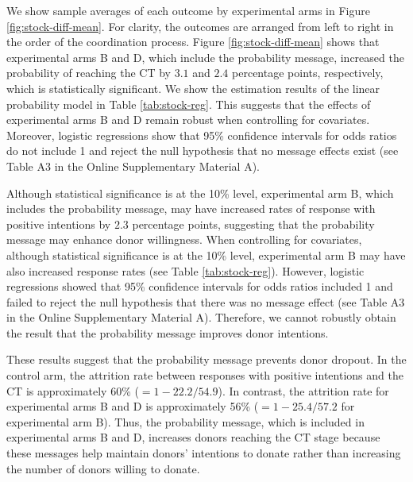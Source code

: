 \documentclass[12pt, a4paper]{article}
\begin{document}
We show sample averages of each outcome by experimental arms in Figure \ref{fig:stock-diff-mean}. For clarity, the outcomes are arranged from left to right in the order of the coordination process. Figure \ref{fig:stock-diff-mean} shows that experimental arms B and D, which include the probability message, increased the probability of reaching the CT by \(3.1\) and \(2.4\) percentage points, respectively, which is statistically significant. We show the estimation results of the linear probability model in Table \ref{tab:stock-reg}. This suggests that the effects of experimental arms B and D remain robust when controlling for covariates. Moreover, logistic regressions show that 95\% confidence intervals for odds ratios do not include 1 and reject the null hypothesis that no message effects exist (see Table A3 in the Online Supplementary Material A).

Although statistical significance is at the 10\% level, experimental arm B, which includes the probability message, may have increased rates of response with positive intentions by \(2.3\) percentage points, suggesting that the probability message may enhance donor willingness. When controlling for covariates, although statistical significance is at the 10\% level, experimental arm B may have also increased response rates (see Table \ref{tab:stock-reg}). However, logistic regressions showed that 95\% confidence intervals for odds ratios included 1 and failed to reject the null hypothesis that there was no message effect (see Table A3 in the Online Supplementary Material A). Therefore, we cannot robustly obtain the result that the probability message improves donor intentions.

These results suggest that the probability message prevents donor dropout. In the control arm, the attrition rate between responses with positive intentions and the CT is approximately 60\% (\(=1 - 22.2/54.9\)). In contrast, the attrition rate for experimental arms B and D is approximately 56\% (\(=1 - 25.4/57.2\) for experimental arm B). Thus, the probability message, which is included in experimental arms B and D, increases donors reaching the CT stage because these messages help maintain donors' intentions to donate rather than increasing the number of donors willing to donate.
\end{document}
